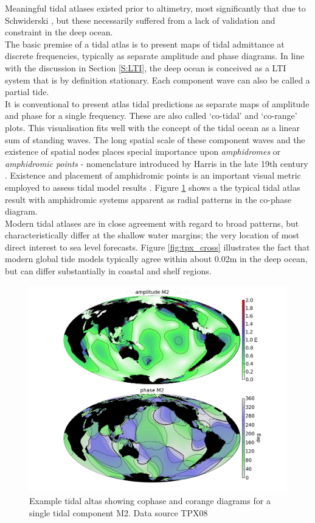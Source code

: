 Meaningful tidal atlases existed prior to altimetry, most significantly that due to Schwiderski \citep{Schwiderski:1983ke}, but these necessarily suffered from a lack of validation and constraint in the deep ocean.\\
The basic premise of a tidal atlas is to present maps of tidal admittance at discrete frequencies, typically as separate amplitude and phase diagrams.   In line with the discussion in Section \ref{S:LTI}, the deep ocean is conceived as a LTI system that is by definition stationary.  Each component wave can also be called a partial tide.\\
It is conventional to present atlas tidal predictions as separate maps of amplitude and phase for a single frequency.  These are also called `co-tidal' and `co-range' plots.  This visualisation fits well with the concept of the tidal ocean as a linear sum of standing waves.   The long spatial scale of these component waves and the existence of spatial nodes places special importance upon \emph{amphidromes} or \emph{amphidromic points} - nomenclature introduced by Harris in the late 19th century \cite[pp 119]{Cartwright:2000tt}.  Existence and placement of amphidromic points is an important visual metric employed to assess tidal model results \citep{foreman:2012perscomm}.  Figure \ref{fig:atlas} shows a the typical tidal atlas result with amphidromic systems apparent as radial patterns in the co-phase diagram.\\
Modern tidal atlases are in close agreement with regard to broad patterns, but characteristically differ at the shallow water margins; the very location of most direct interest to sea level forecasts.  Figure \ref{fig:tpx_cross} illustrates the fact that modern global tide models typically agree within about 0.02m in the deep ocean, but can differ substantially in coastal and shelf regions.  


\begin{figure}[h]
\begin{center}
\includegraphics[width=130mm]{figures/maps/global_m2_tpx08.png}
\caption{Example tidal altas showing cophase and corange diagrams for a single tidal component M2.  Data source TPX08 \cite{Egbert:2002ug}  }
\label{fig:atlas}
\end{center}
\end{figure}


